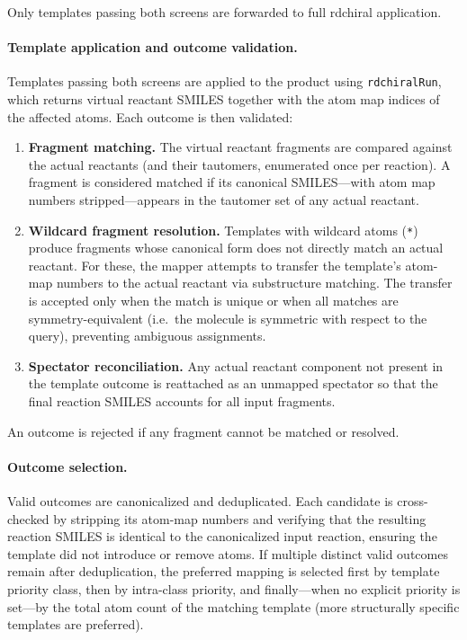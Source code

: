 \documentclass[12pt]{article}
\begin{document}
Only templates passing both screens are forwarded to full rdchiral application.

\paragraph{Template application and outcome validation.}
Templates passing both screens are applied to the product using
\texttt{rdchiralRun}, which returns virtual reactant SMILES together with the
atom map indices of the affected atoms.  Each outcome is then validated:

\begin{enumerate}[leftmargin=*, label=(\arabic*)]
  \item \textbf{Fragment matching.}  The virtual reactant fragments are
        compared against the actual reactants (and their tautomers, enumerated
        once per reaction).  A fragment is considered matched if its canonical
        SMILES---with atom map numbers stripped---appears in the tautomer set
        of any actual reactant.
  \item \textbf{Wildcard fragment resolution.}  Templates with wildcard atoms
        (\texttt{*}) produce fragments whose canonical form does not directly
        match an actual reactant.  For these, the mapper attempts to transfer
        the template's atom-map numbers to the actual reactant via substructure
        matching.  The transfer is accepted only when the match is unique or
        when all matches are symmetry-equivalent (i.e.\ the molecule is
        symmetric with respect to the query), preventing ambiguous assignments.
  \item \textbf{Spectator reconciliation.}  Any actual reactant component not
        present in the template outcome is reattached as an unmapped spectator
        so that the final reaction SMILES accounts for all input fragments.
\end{enumerate}

An outcome is rejected if any fragment cannot be matched or resolved.

\paragraph{Outcome selection.}
Valid outcomes are canonicalized and deduplicated.  Each candidate is
cross-checked by stripping its atom-map numbers and verifying that the
resulting reaction SMILES is identical to the canonicalized input reaction,
ensuring the template did not introduce or remove atoms.  If
multiple distinct valid outcomes remain after deduplication, the preferred
mapping is selected first by template priority class, then by intra-class
priority, and finally---when no explicit priority is set---by the total atom
count of the matching template (more structurally specific templates are
preferred).
\end{document}
